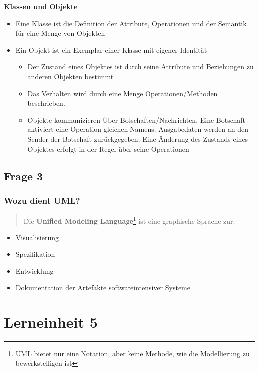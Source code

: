\documentclass[a4paper]{article}
\begin{document}
			\textbf{Klassen und Objekte}
			\begin{itemize}
				\item Eine Klasse ist die Definition der Attribute, Operationen und der Semantik für eine Menge von Objekten
				\item Ein Objekt ist ein Exemplar einer Klasse mit eigener Identität
				\begin{itemize}
					\item Der Zustand eines Objektes ist durch seine Attribute und Beziehungen zu anderen Objekten bestimmt
					\item Das Verhalten wird durch eine Menge Operationen/Methoden beschrieben. 
					\item Objekte kommunizieren Über Botschaften/Nachrichten. Eine Botschaft aktiviert eine Operation gleichen Namens. Ausgabedaten werden an den Sender der Botschaft zurückgegeben. Eine Änderung des Zustands eines Objektes erfolgt in der Regel über seine Operationen
				\end{itemize}
			\end{itemize}
			
			\subsection{Frage 3}
			\label{le4-3}
			\subsubsection{Wozu dient UML?}
			\begin{quote}
				Die \textbf{Unified Modeling Language}\footnote{UML bietet nur eine Notation, aber keine Methode, wie die Modellierung zu bewerkstelligen ist} ist eine graphische Sprache zur:
			\end{quote}
			
			\begin{itemize}
				\item Visualisierung
				\item Spezifikation
				\item Entwicklung
				\item Dokumentation der Artefakte softwareintensiver Systeme
			\end{itemize}
			
			\pagebreak
			
			\section{Lerneinheit 5}
\end{document}
